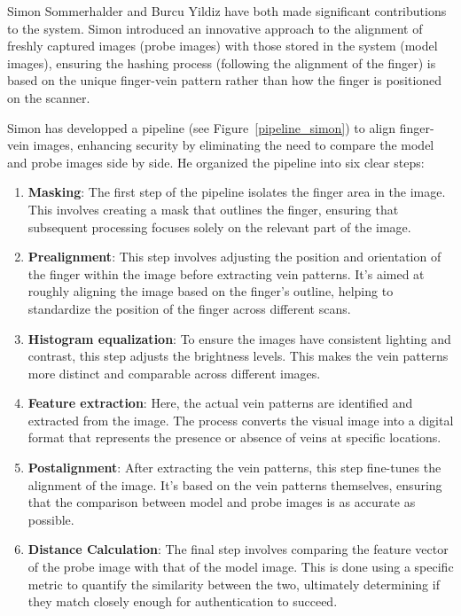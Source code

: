 Simon Sommerhalder and Burcu Yildiz have both made significant contributions to the system. Simon introduced an innovative approach to the alignment of freshly captured images (probe images) with those stored in the system (model images), ensuring the hashing process (following the alignment of the finger) is based on the unique finger-vein pattern rather than how the finger is positioned on the scanner.

Simon has developped a pipeline (see Figure~\ref{pipeline_simon}) to align finger-vein images, enhancing security by eliminating the need to compare the model and probe images side by side. He organized the pipeline into six clear steps:

\begin{enumerate}
    \item \textbf{Masking}: The first step of the pipeline isolates the finger area in the image. This involves creating a mask that outlines the finger, ensuring that subsequent processing focuses solely on the relevant part of the image.

    \item \textbf{Prealignment}: This step involves adjusting the position and orientation of the finger within the image before extracting vein patterns. It's aimed at roughly aligning the image based on the finger's outline, helping to standardize the position of the finger across different scans.

    \item \textbf{Histogram equalization}: To ensure the images have consistent lighting and contrast, this step adjusts the brightness levels. This makes the vein patterns more distinct and comparable across different images.

    \item \textbf{Feature extraction}: Here, the actual vein patterns are identified and extracted from the image. The process converts the visual image into a digital format that represents the presence or absence of veins at specific locations.

    \item \textbf{Postalignment}: After extracting the vein patterns, this step fine-tunes the alignment of the image. It's based on the vein patterns themselves, ensuring that the comparison between model and probe images is as accurate as possible.

    \item \textbf{Distance Calculation}: The final step involves comparing the feature vector of the probe image with that of the model image. This is done using a specific metric to quantify the similarity between the two, ultimately determining if they match closely enough for authentication to succeed.
\end{enumerate} 

